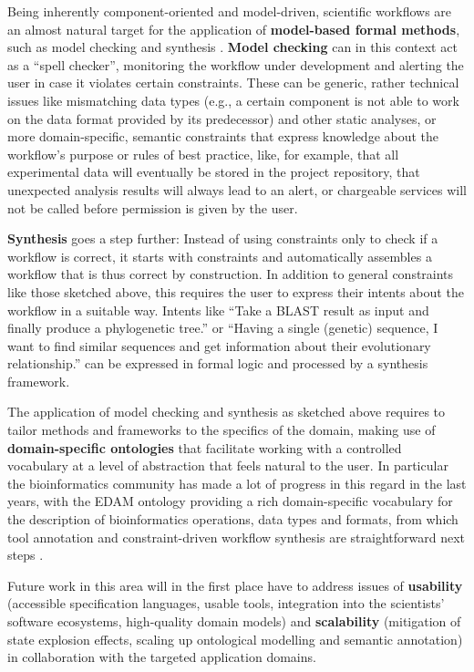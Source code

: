 \documentclass[sigplan,10pt,noacm]{acmart}
\begin{document}
Being inherently component-oriented and model-driven, scientific workflows are an almost natural target for the application of \textbf{model-based formal methods}, such as model checking and synthesis \cite{LaMaSt2008,Lampre2013}.
\textbf{Model checking} can in this context act as a \enquote{spell checker}, monitoring the workflow under development and alerting the user in case it violates certain constraints. These can be generic, rather technical issues like mismatching data types (e.g., a certain component is not able to work on the data format provided by its predecessor) and other static analyses, or more domain-specific, semantic constraints that express knowledge about the workflow's purpose or rules of best practice, like, for example, that all experimental data will eventually be stored in the project repository, that unexpected analysis results will always lead to an alert, or chargeable services will not be called before permission is given by the user.

\textbf{Synthesis} goes a step further: Instead of using constraints only to check if a workflow is correct, it starts with constraints and automatically assembles a workflow that is thus correct by construction. In addition to general constraints like those sketched above, this requires the user to express their intents about the workflow in a suitable way. Intents like \enquote{Take a BLAST result as input and finally produce a phylogenetic tree.} or \enquote{Having a single (genetic) sequence, I want to find similar sequences and get information about their evolutionary relationship.} can be expressed in formal logic and processed by a synthesis framework.

The application of model checking and synthesis as sketched above requires to tailor methods and frameworks to the specifics of the domain, making use of \textbf{domain-specific ontologies} that facilitate working with a controlled vocabulary at a level of abstraction that feels natural to the user. In particular the bioinformatics community has made a lot of progress in this regard in the last years, with the EDAM ontology providing a rich domain-specific vocabulary for the description of bioinformatics operations, data types and formats, from which tool annotation and constraint-driven workflow synthesis are straightforward next steps \cite{PaLaIS2018}. 

Future work in this area will in the first place have to address issues of \textbf{usability} (accessible specification languages, usable tools, integration into the scientists' software ecosystems, high-quality domain models) and \textbf{scalability} (mitigation of state explosion effects, scaling up ontological modelling and semantic annotation) in collaboration with the targeted application domains. 
\end{document}
